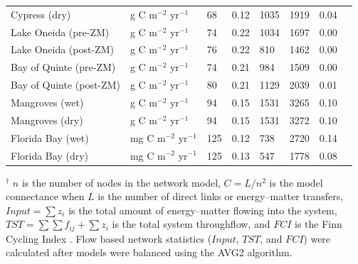 \documentclass[article]{jss}
\begin{document}
\begin{table}[ht]
\begin{center}
\begin{tiny}
\begin{tabularx}{\textwidth}{llllllll}
      Cypress (dry) & g C m$^{-2}$ yr$^{-1}$  &  68 & 0.12 & 1035 & 1919 & 0.04 &  \citet{ulanowicz97_cypress} \\
      Lake Oneida (pre-ZM) & g C m$^{-2}$ yr$^{-1}$  &  74 & 0.22 & 1034 & 1697 & 0.00 &  \citet{miehls09_oneida} \\
      Lake Oneida (post-ZM) & g C m$^{-2}$ yr$^{-1}$  &  76 & 0.22 & 810 & 1462 & 0.00 &  \citet{miehls09_oneida} \\
      Bay of Quinte (pre-ZM) & g C m$^{-2}$ yr$^{-1}$  &  74 & 0.21 & 984 & 1509 & 0.00 &   \citet{miehls09_quinte} \\
      Bay of Quinte (post-ZM) & g C m$^{-2}$ yr$^{-1}$  &  80 & 0.21 & 1129 & 2039 & 0.01 &   \citet{miehls09_quinte} \\
      Mangroves (wet) & g C m$^{-2}$ yr$^{-1}$  &  94 & 0.15 & 1531 & 3265 & 0.10 &  \citet{ulanowicz99_mangrove} \\
      Mangroves (dry) & g C m$^{-2}$ yr$^{-1}$  &  94 & 0.15 & 1531 & 3272 & 0.10 &  \citet{ulanowicz99_mangrove} \\
      Florida Bay (wet) & mg C m$^{-2}$ yr$^{-1}$  & 125 & 0.12 & 738 & 2720 & 0.14 &  \citet{ulanowicz98_fb} \\
      Florida Bay (dry) & mg C m$^{-2}$ yr$^{-1}$  & 125 & 0.13 & 547 & 1778 & 0.08 &  \citet{ulanowicz98_fb} \\
      \hline
\end{tabularx}
\end{tiny}
\end{center}
\begin{scriptsize}
  $^\dagger$ $n$ is the number of nodes in the network model,
  $C=L/n^2$ is the model connectance when $L$ is the number of direct
  links or energy--matter transfers, $Input =\sum{z_i}$ is the total
  amount of energy--matter flowing into the system,
  $TST=\sum\sum{f_{ij}}+\sum{z_i}$ is the total system throughflow,
  and $FCI$ is the Finn Cycling Index \citep{finn80}. Flow based
  network statistics ($Input$, $TST$, and $FCI$) were calculated after
  models were balanced using the AVG2 algorithm.
\end{scriptsize}
\end{table}
\end{document}
